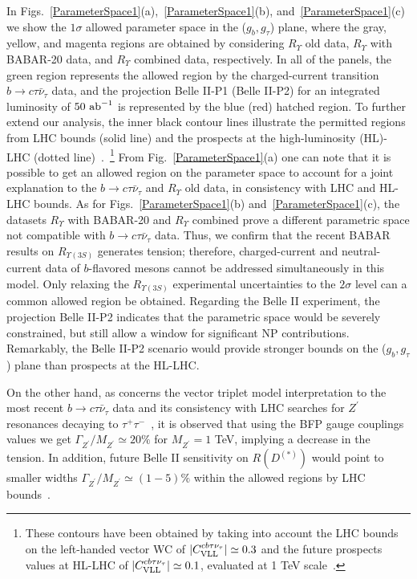 \documentclass[reprint,showpacs,aps,prd,nofootinbib,superscriptaddress,longbibliography]{revtex4-1}
\begin{document}
In Figs.~\ref{ParameterSpace1}(a),~\ref{ParameterSpace1}(b), and~\ref{ParameterSpace1}(c) we show the $1\sigma$ allowed parameter space in the ($g_b,g_{\tau}$) plane, where the gray, yellow, and magenta regions are obtained by considering $R_\Upsilon$ old data, $R_\Upsilon$ with BABAR-20 data, and $R_\Upsilon$ combined data, respectively. In all of the panels, the green region represents the allowed region by the charged-current transition $b\to c \tau \bar{\nu}_{\tau}$ data, and the projection Belle II-P1 (Belle II-P2) for an integrated luminosity of $50 \ {\rm ab}^{-1}$ is represented by the blue (red) hatched region. To further extend our analysis, the inner black contour lines illustrate the permitted regions from LHC bounds (solid line) and the prospects at the high-luminosity (HL)-LHC (dotted line)~\cite{Iguro:2020keo,Marzocca:2020ueu}.~\footnote{These contours have been obtained by taking into account the LHC bounds on the left-handed vector WC of $\vert  C_{\rm VLL}^{cb\tau\nu_\tau} \vert \simeq 0.3$ and the future prospects values at HL-LHC of $\vert  C_{\rm VLL}^{cb\tau\nu_\tau} \vert \simeq 0.1$, evaluated at 1 TeV scale~\cite{Iguro:2020keo,Marzocca:2020ueu}.}
From Fig.~\ref{ParameterSpace1}(a) one can note that it is possible to get an allowed region on the parameter space to account for a joint explanation to the $b \to c \tau \bar{\nu}_\tau$ and $R_\Upsilon$ old data, in consistency with LHC and HL-LHC bounds. As for Figs.~\ref{ParameterSpace1}(b) and~\ref{ParameterSpace1}(c), the datasets $R_\Upsilon$ with BABAR-20 and $R_\Upsilon$ combined prove a different parametric space not compatible with $b\to c \tau \bar{\nu}_{\tau}$ data. Thus, we confirm that the recent BABAR results on $R_{\Upsilon(3S)}$ generates tension; therefore, charged-current and neutral-current data of $b$-flavored mesons cannot be addressed simultaneously in this model. Only relaxing the $R_{\Upsilon(3S)}$ experimental uncertainties to the $2\sigma$ level can a common allowed region be obtained. Regarding the Belle II experiment, the projection Belle II-P2 indicates that the parametric space would be severely constrained, but still allow a window for significant NP contributions. Remarkably, the Belle II-P2 scenario would provide stronger bounds on the ($g_b,g_{\tau}$) plane than prospects at the HL-LHC. 

On the other hand, as concerns the vector triplet model interpretation to the most recent $b \to c \tau \bar{\nu}_\tau$ data and its consistency with LHC searches for $Z^\prime$ resonances decaying to $\tau^+\tau^-$~\cite{Greljo:2015mma,Faroughy:2016osc}, it is observed that using the BFP gauge couplings values we get $\Gamma_{Z^\prime} / M_{Z^\prime} \simeq 20 \%$ for $M_{Z^\prime} = 1$ TeV, implying a decrease in the tension. In addition, future Belle II sensitivity on $R(D^{(\ast)})$ would point to smaller widths $\Gamma_{Z^\prime} / M_{Z^\prime} \simeq (1 - 5) \%$ within the allowed regions by LHC bounds~\cite{Greljo:2015mma,Faroughy:2016osc}.
\end{document}
